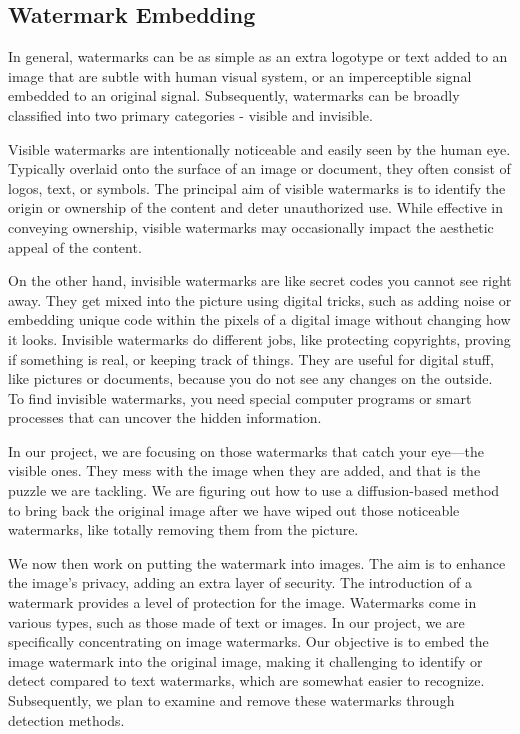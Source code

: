 \subsection{Watermark Embedding}
In general, watermarks can be as simple as an extra logotype or text added to an image that are subtle with human visual system, or an imperceptible signal embedded to an original signal. Subsequently, watermarks can be broadly classified into two primary categories - visible and invisible.

Visible watermarks are intentionally noticeable and easily seen by the human eye. Typically overlaid onto the surface of an image or document, they often consist of logos, text, or symbols. The principal aim of visible watermarks is to identify the origin or ownership of the content and deter unauthorized use. While effective in conveying ownership, visible watermarks may occasionally impact the aesthetic appeal of the content.

On the other hand, invisible watermarks are like secret codes you cannot see right away. They get mixed into the picture using digital tricks, such as adding noise or embedding unique code within the pixels of a digital image without changing how it looks. Invisible watermarks do different jobs, like protecting copyrights, proving if something is real, or keeping track of things. They are useful for digital stuff, like pictures or documents, because you do not see any changes on the outside. To find invisible watermarks, you need special computer programs or smart processes that can uncover the hidden information.

In our project, we are focusing on those watermarks that catch your eye—the visible ones. They mess with the image when they are added, and that is the puzzle we are tackling. We are figuring out how to use a diffusion-based method to bring back the original image after we have wiped out those noticeable watermarks, like totally removing them from the picture.

We now then work on putting the watermark into images. The aim is to enhance the image's privacy, adding an extra layer of security. The introduction of a watermark provides a level of protection for the image. Watermarks come in various types, such as those made of text or images. In our project, we are specifically concentrating on image watermarks. Our objective is to embed the image watermark into the original image, making it challenging to identify or detect compared to text watermarks, which are somewhat easier to recognize. Subsequently, we plan to examine and remove these watermarks through detection methods.

